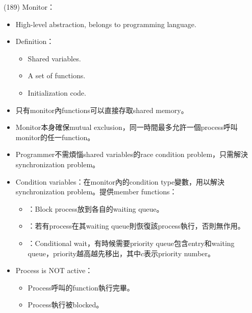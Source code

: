 \begin{theorem}{(189)} Monitor：\begin{itemize}
        \item High-level abstraction, belongs to programming language.
        \item Definition：\begin{itemize}
            \item Shared variables.
            \item A set of functions.
            \item Initialization code.
        \end{itemize} 
        \item 只有monitor內functions可以直接存取shared memory。
        \item Monitor本身確保mutual exclusion，同一時間最多允許一個process呼叫monitor的任一function。
        \item Programmer不需煩惱shared variables的race condition problem，只需解決synchronization problem。
        \item Condition variables：在monitor內的condition type變數，用以解決synchronization problem。提供member functions：\begin{itemize}
            \item {}：Block process放到各自的waiting queue。
            \item {}：若有process在其waiting queue則恢復該process執行，否則無作用。
            \item {}：Conditional wait，有時候需要priority queue包含entry和waiting queue，priority越高越先移出，其中$c$表示priority number。
        \end{itemize}
        \item Process is NOT active：\begin{itemize}
            \item Process呼叫的function執行完畢。
            \item Process執行被blocked。
        \end{itemize}
    \end{itemize}
\end{theorem}

